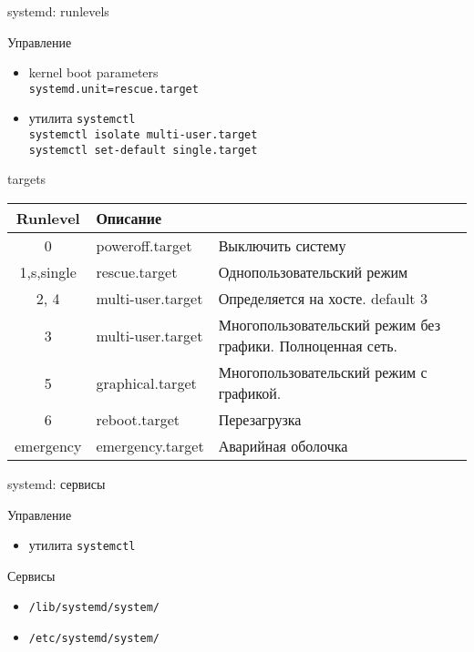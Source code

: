 \begin{frame}{systemd: runlevels}
	\begin{block}{Управление}
		\begin{itemize}
			\item kernel boot parameters\\
				{\tt systemd.unit=rescue.target} \\
			\item утилита {\tt systemctl} \\
				{\tt systemctl isolate multi-user.target} \\
				{\tt systemctl set-default single.target}
		\end{itemize}
	\end{block}

	\begin{block}{targets}
		\tiny
		\begin{table}
			\begin{tabular}{| c | l | l | }
			\hline
			Runlevel & Описание\\
			\hline
			0	& poweroff.target & Выключить систему \\
			1,s,single & rescue.target  & Однопользовательский режим \\
			2, 4	& multi-user.target & Определяется на хосте. default 3\\
			3	& multi-user.target & Многопользовательский режим без графики. Полноценная сеть. \\
			5	& graphical.target & Многопользовательский режим с графикой.\\
			6	& reboot.target & Перезагрузка\\
			emergency & emergency.target & Аварийная оболочка \\
			\hline
			\end{tabular}
		\end{table}
	\end{block}
\end{frame}

\begin{frame}{systemd: сервисы}
	\begin{block}{Управление}
		\begin{itemize}
			\item утилита {\tt systemctl}
		\end{itemize}
	\end{block}

	\begin{block}{Сервисы}
		\begin{itemize}
			\item {\tt /lib/systemd/system/}
			\item {\tt /etc/systemd/system/}
		\end{itemize}
	\end{block}
\end{frame}
